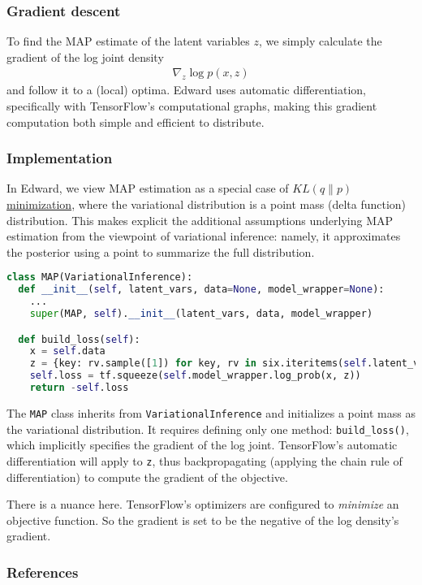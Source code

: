 \subsubsection{Gradient descent}

To find the MAP estimate of the latent variables $z$, we simply
calculate the gradient of the log joint density
\begin{align*}
  \nabla_z
  \log p(x, z)
\end{align*}
and follow it to a (local) optima.
Edward uses automatic differentiation, specifically with TensorFlow's
computational graphs, making this gradient computation both simple and
efficient to distribute.

\subsubsection{Implementation}

In Edward, we view MAP estimation as a special case of
\href{tut_KLqp}{$KL(q\|p)$ minimization}, where the variational
distribution is a point mass (delta function) distribution. This makes
explicit the additional assumptions underlying MAP estimation from the
viewpoint of variational inference: namely, it approximates the
posterior using a point to summarize the full distribution.

\begin{lstlisting}[language=Python]
class MAP(VariationalInference):
  def __init__(self, latent_vars, data=None, model_wrapper=None):
    ...
    super(MAP, self).__init__(latent_vars, data, model_wrapper)

  def build_loss(self):
    x = self.data
    z = {key: rv.sample([1]) for key, rv in six.iteritems(self.latent_vars)}
    self.loss = tf.squeeze(self.model_wrapper.log_prob(x, z))
    return -self.loss
\end{lstlisting}

The \texttt{MAP} class inherits from \texttt{VariationalInference} and
initializes a point mass as the variational distribution. It requires
defining only one method:
\texttt{build_loss()}, which implicitly specifies the gradient of the
log joint. TensorFlow's automatic differentiation will apply to
\texttt {z}, thus backpropagating (applying the chain rule of
differentiation) to compute the gradient of the objective.

There is a nuance here. TensorFlow's optimizers are configured to
\emph{minimize} an objective function. So the gradient is set to be
the negative of the log density's gradient.

\subsubsection{References}\label{references}
